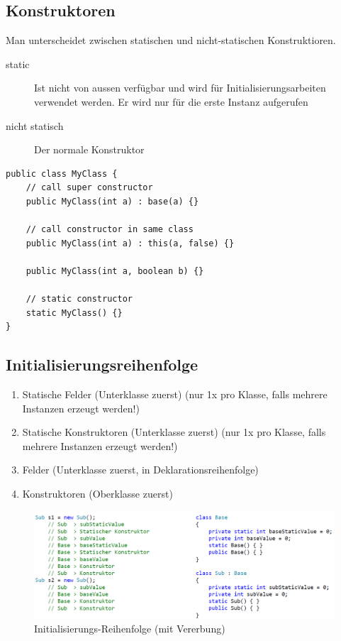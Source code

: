 \subsection{Konstruktoren}
Man unterscheidet zwischen statischen und nicht-statischen Konstruktioren.
\begin{description}
	\item[static] Ist nicht von aussen verfügbar und wird für Initialisierungsarbeiten verwendet werden. Er wird nur für die erste Instanz aufgerufen
	\item[nicht statisch] Der normale Konstruktor
\end{description}
\begin{lstlisting}
public class MyClass {
	// call super constructor
	public MyClass(int a) : base(a) {}

	// call constructor in same class
	public MyClass(int a) : this(a, false) {}
	
	public MyClass(int a, boolean b) {}
	
	// static constructor
	static MyClass() {}
}
\end{lstlisting}

\subsection{Initialisierungsreihenfolge}
\begin{enumerate}
	\item Statische Felder (Unterklasse zuerst) (nur 1x pro Klasse, falls mehrere Instanzen erzeugt werden!)
	\item Statische Konstruktoren (Unterklasse zuerst) (nur 1x pro Klasse, falls mehrere Instanzen erzeugt werden!)
	\item Felder (Unterklasse zuerst, in Deklarationsreihenfolge)
	\item Konstruktoren (Oberklasse zuerst)
\end{enumerate}

\begin{figure}[h]
\centering
\includegraphics[width=0.9\linewidth]{images/init_order}
\caption{Initialisierungs-Reihenfolge (mit Vererbung)}
\label{fig:initorder}
\end{figure}

